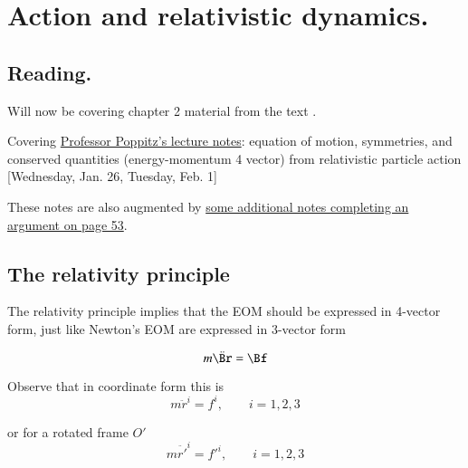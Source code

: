 %
%

\chapter{Action and relativistic dynamics.}
\label{chap:relativisticElectrodynamicsL7}
{}
\date{Jan 26, 2011}

\beginArtNoToc

\section{Reading.}

Will now be covering chapter 2 material from the text \citep{landau1980classical}.

Covering \href{http://www.physics.utoronto.ca/~poppitz/epoppitz/PHY450_files/RelEMpp52-56.pdf}{Professor Poppitz's lecture notes}: equation of motion, symmetries, and conserved quantities (energy-momentum 4 vector) from relativistic particle action [Wednesday, Jan. 26, Tuesday, Feb. 1]

These notes are also augmented by \href{http://www.physics.utoronto.ca/~poppitz/epoppitz/PHY450_files/RelEMp53.1.pdf}{some additional notes completing an argument on page 53}.

\section{The relativity principle}

The relativity principle implies that the EOM should be expressed in 4-vector form, just like Newton's EOM are expressed in 3-vector form

\begin{equation}\label{eqn:relativisticElectrodynamicsL7:10}
m \ddot{\Br} = \Bf
\end{equation}

Observe that in coordinate form this is
\begin{equation}\label{eqn:relativisticElectrodynamicsL7:20}
m \ddot{r}^i = f^i, \qquad i = 1,2,3
\end{equation}

or for a rotated frame $O'$
\begin{equation}\label{eqn:relativisticElectrodynamicsL7:30}
m \ddot{r'}^i = {f'}^i, \qquad i = 1,2,3
\end{equation}

